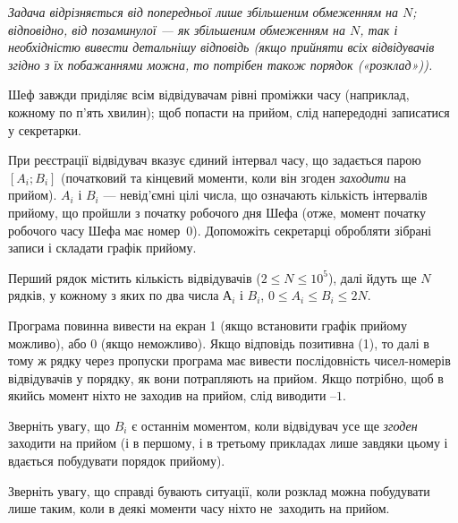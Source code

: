 ﻿{\it Задача відрізняється від попередньої \emph{лише} збільшеним обмеженням на $N$; відповідно, від позаминулої --- як збільшеним обмеженням на $N$, так і необхідністю вивести детальнішу відповідь (якщо прийняти всіх відвідувачів згідно з їх побажаннями можна, то потрібен також порядок («розклад»)).}

Шеф завжди приділяє всім відвідувачам рівні проміжки часу (наприклад, кожному по п'ять хвилин); щоб попасти на прийом, слід напередодні записатися у секретарки.

При реєстрації відвідувач вказує єдиний інтервал часу, що задається парою $[A_i; B_i]$ (початковий та кінцевий моменти, коли він згоден \emph{заходити} на прийом). $A_i$ і $B_i$ --- невід’ємні цілі числа, що означають кількість інтервалів прийому, що пройшли з початку робочого дня Шефа (отже, момент початку робочого часу Шефа має номер~0). Допоможіть секретарці обробляти зібрані записи і складати графік прийому.

\InputFile
Перший рядок містить кількість відвідувачів ($2\leqslant N\leqslant 10^5$), далі йдуть ще $N$ рядків, у кожному з яких по два числа $А_i$ і $B_i$, $0\leqslant A_i\leqslant B_i\leqslant 2N$.

\OutputFile
Програма повинна вивести на екран 1 (якщо встановити графік прийому можливо), або 0 (якщо неможливо). Якщо відповідь позитивна (1), то далі в тому ж рядку через пропуски програма має вивести послідовність чисел-номерів відвідувачів у порядку, як вони потрапляють на прийом. Якщо потрібно, щоб в якийсь момент ніхто не заходив на прийом, слід виводити $–1$.


\Examples
\begin{example}
\end{example}

\Note
Зверніть увагу, що $B_i$ є останнім моментом, коли відвідувач усе ще \emph{згоден} заходити на прийом (і в першому, і в третьому прикладах лише завдяки цьому і вдається побудувати порядок прийому).

Зверніть увагу, що справді бувають ситуації, коли розклад можна побудувати лише таким, коли в деякі моменти часу ніхто не~заходить на прийом.
